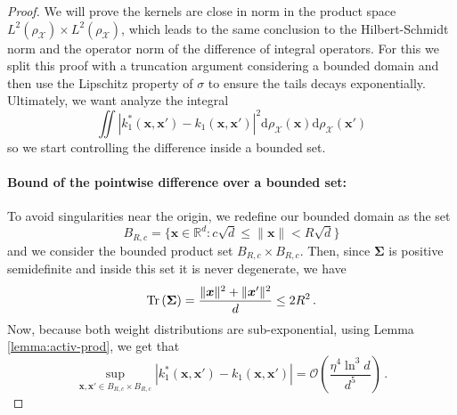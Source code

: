\begin{proof}
    We will prove the kernels are close in norm in the product space $L^2(\rho_{\mathcal X}) \times L^2(\rho_{\mathcal X})$, which leads to the same conclusion to the Hilbert-Schmidt norm and the operator norm of the difference of integral operators. For this we split this proof with a truncation argument considering a bounded domain and then use the Lipschitz property of $\sigma$ to ensure the tails decays exponentially. 
    Ultimately, we want analyze the integral
    \[
        \iint|k_1^*(\bm x, \bm x') - k_1(\bm x, \bm x')|^2 \mathrm d \rho_{\mathcal X}(\bm x)\mathrm d \rho_{\mathcal X}(\bm x')
    \]
    so we start controlling the difference inside a bounded set.
    \paragraph{Bound of the pointwise difference over a bounded set: }
    To avoid singularities near the origin, we redefine our bounded domain as the set
    \[
        B_{R,c} = \{\bm x \in \mathbb{R}^d : c\sqrt{d} \le \|\bm x\| < R\sqrt{d}\}
    \]
    and we consider the bounded product set $B_{R,c} \times B_{R,c}$.
    Then, since $\bm \Sigma$ is positive semidefinite and inside this set it is never degenerate, we have 
    \[
        \operatorname{Tr}\left({\bm \Sigma}\right) = \frac{\|\bm x\|^2 + \|\bm x'\|^2}{d} \leq 2R^2\, .
    \]
    Now, because both weight distributions are sub-exponential, using Lemma \ref{lemma:activ-prod}, we get that
    \[
        \sup_{\bm x, \bm x' \in B_{R, c} \times B_{R, c}}|k_1^*(\bm x, \bm x') - k_1(\bm x, \bm x')| = \mathcal O\left(\frac{\eta^4\ln^3 d}{d^5}\right)\, .
    \]


\end{proof}
